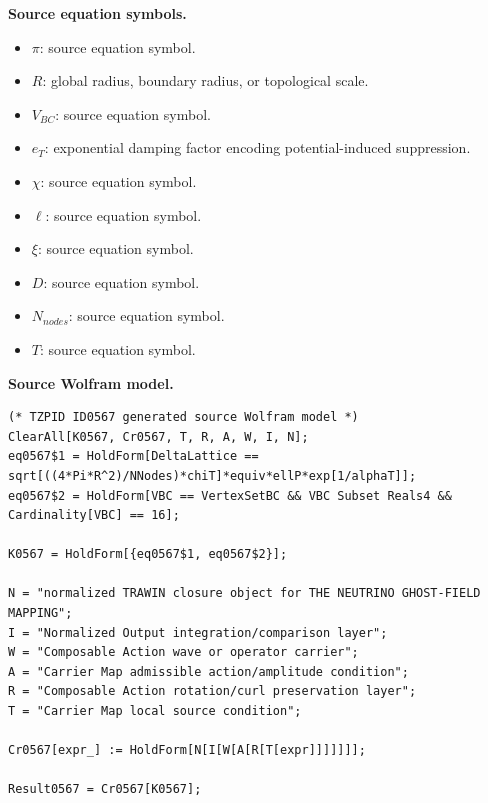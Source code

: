 \begin{minipage}[t]{0.49\linewidth}
\begingroup
\small
\raggedright
\textbf{Source equation symbols.}\par
\begin{itemize}[leftmargin=1.35em,itemsep=1pt,topsep=1pt,parsep=0pt]
    \item $\pi$: source equation symbol.
    \item $R$: global radius, boundary radius, or topological scale.
    \item $V_{BC}$: source equation symbol.
    \item $e_T$: exponential damping factor encoding potential-induced suppression.
    \item $\chi$: source equation symbol.
    \item $\ell$: source equation symbol.
    \item $\xi$: source equation symbol.
    \item $D$: source equation symbol.
    \item $N_{nodes}$: source equation symbol.
    \item $T$: source equation symbol.
\end{itemize}
\endgroup
\end{minipage}\hfill
\begin{minipage}[t]{0.47\linewidth}
\begingroup
\scriptsize
\raggedright
\textbf{Source Wolfram model.}\par
\begin{Verbatim}[fontsize=\tiny,breaklines=true,breakanywhere=true]
(* TZPID ID0567 generated source Wolfram model *)
ClearAll[K0567, Cr0567, T, R, A, W, I, N];
eq0567$1 = HoldForm[DeltaLattice == sqrt[((4*Pi*R^2)/NNodes)*chiT]*equiv*ellP*exp[1/alphaT]];
eq0567$2 = HoldForm[VBC == VertexSetBC && VBC Subset Reals4 && Cardinality[VBC] == 16];

K0567 = HoldForm[{eq0567$1, eq0567$2}];

N = "normalized TRAWIN closure object for THE NEUTRINO GHOST-FIELD MAPPING";
I = "Normalized Output integration/comparison layer";
W = "Composable Action wave or operator carrier";
A = "Carrier Map admissible action/amplitude condition";
R = "Composable Action rotation/curl preservation layer";
T = "Carrier Map local source condition";

Cr0567[expr_] := HoldForm[N[I[W[A[R[T[expr]]]]]]];

Result0567 = Cr0567[K0567];
\end{Verbatim}
\endgroup
\end{minipage}

